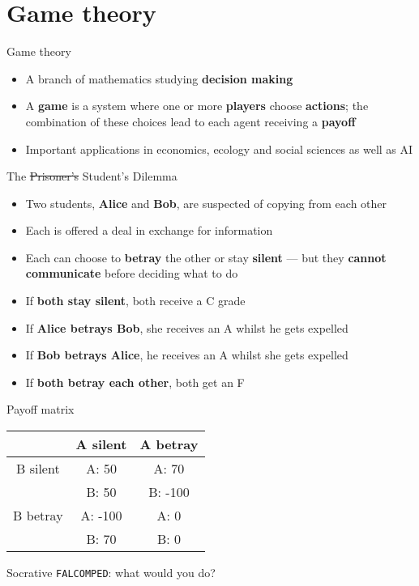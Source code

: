 \part{Game theory}
\frame{\partpage}

\begin{frame}{Game theory}
	\begin{itemize}
		\pause\item A branch of mathematics studying \textbf{decision making}
		\pause\item A \textbf{game} is a system where one or more \textbf{players} choose \textbf{actions};
			the combination of these choices lead to each agent receiving a \textbf{payoff}
		\pause\item Important applications in economics, ecology and social sciences as well as AI
	\end{itemize}
\end{frame}

\begin{frame}{The \sout{Prisoner's} Student's Dilemma}
	\begin{itemize}
		\pause\item Two students, \textbf{Alice} and \textbf{Bob}, are suspected of copying from each other
		\pause\item Each is offered a deal in exchange for information
		\pause\item Each can choose to \textbf{betray} the other or stay \textbf{silent}
			--- but they \textbf{cannot communicate} before deciding what to do
		\pause\item If \textbf{both stay silent}, both receive a C grade
		\pause\item If \textbf{Alice betrays Bob}, she receives an A whilst he gets expelled
		\pause\item If \textbf{Bob betrays Alice}, he receives an A whilst she gets expelled
		\pause\item If \textbf{both betray each other}, both get an F
	\end{itemize}
\end{frame}

\begin{frame}{Payoff matrix}
	\pause
	\begin{center}
		\begin{tabular}{|c|c|c|}
			\hline
			         & A silent & A betray \\\hline
			B silent & A: 50    & A: 70 \\
			         & B: 50    & B: -100 \\\hline
			B betray & A: -100  & A: 0 \\
			         & B: 70    & B: 0 \\\hline
		\end{tabular}
	\end{center}
	\pause
	Socrative \texttt{FALCOMPED}: what would you do?
\end{frame}

